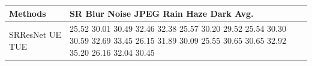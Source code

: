 \begin{tabular}{ll}
\toprule
Methods & SR Blur Noise JPEG Rain Haze Dark Avg. \\
\midrule
SRResNet UE TUE & 25.52 30.01 30.49 32.46 32.38 25.57 30.20 29.52 25.54 30.30 30.59 32.69 33.45 26.15 31.89 30.09 25.55 30.65 30.65 32.92 35.20 26.16 32.04 30.45 \\
\bottomrule
\end{tabular}
